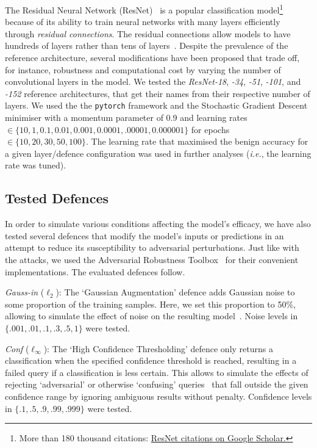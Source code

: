 The Residual Neural Network (ResNet)~\cite{resnet} is a popular classification model\footnote{More than 180 thousand citations: \href{https://scholar.google.com/scholar?cites=9281510746729853742}{ResNet citations on Google Scholar.}} because of its ability to train neural networks with many layers efficiently through \textit{residual connections}.
The residual connections allow models to have hundreds of layers rather than tens of layers~\cite{resnet,vgg}. Despite the prevalence of the reference architecture, several modifications have been proposed that trade off, for instance, robustness and computational cost by varying the number of convolutional layers in the model. We tested the \textit{ResNet-18}, \textit{-34}, \textit{-51}, \textit{-101}, and \textit{-152} reference architectures, that get their names from their respective number of layers. We used the the \texttt{pytorch} framework and the Stochastic Gradient Descent minimiser with a momentum parameter of 0.9 and learning rates $\in \{10, 1, 0.1, 0.01, 0.001, 0.0001, .00001, 0.000001\}$ for epochs $\in \{ 10, 20, 30, 50, 100\}$. The learning rate that maximised the benign accuracy for a given layer/defence configuration was used in further analyses (\textit{i.e.}, the learning rate was tuned).

\subsection{Tested Defences}
\label{defences}

In order to simulate various conditions affecting the model's efficacy, we have also tested several defences that modify the model's inputs or predictions in an attempt to reduce its susceptibility to adversarial perturbations. Just like with the attacks, we used the Adversarial Robustness Toolbox~\cite{art2018} for their convenient implementations. The evaluated defences follow.


\textit{Gauss-in} ($\ell_2$): The `Gaussian Augmentation' defence adds Gaussian noise to some proportion of the training samples. Here, we set this proportion to 50\%, allowing to simulate the effect of noise on the resulting model~\cite{gauss_aug}. Noise levels in $\{.001, .01, .1, .3, .5, 1\}$ were tested.


\textit{Conf} ($\ell_{\infty}$): The `High Confidence Thresholding' defence only returns a classification when the specified confidence threshold is reached, resulting in a failed query if a classification is less certain. This allows to simulate the effects of rejecting `adversarial' or otherwise `confusing' queries~\cite{high_conf} that fall outside the given confidence range by ignoring ambiguous results without penalty. Confidence levels in $\{.1, .5, .9, .99, .999\}$ were tested.



